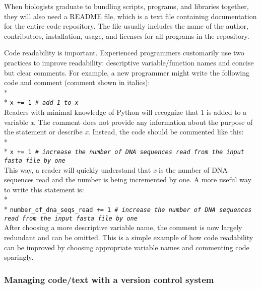 \documentclass[ChapterTOCs,krantz2]{krantz} %
\begin{document}
When biologists graduate to bundling scripts, programs, and libraries together,
they will also need a README file, which is a text file containing
documentation for the entire code repository. The file usually includes
the name of the author, contributors,
installation, usage, and licenses for all programs in the repository.  

Code readability is important.  
Experienced programmers customarily use two practices to improve readability:
descriptive variable/function names and concise but clear comments.  
For example, a new programmer might write the following code and comment 
(comment shown in italics):\\* \\*
\texttt{x += 1  \emph{\# add 1 to x}}\\

Readers with minimal knowledge of Python will recognize that 1 is added
to a variable \emph{x}. The comment does not provide any information about the purpose
of the statement or describe \emph{x}. Instead, the code should be commented like this:\\* \\*
\texttt{x += 1  \emph{\# increase the number of DNA sequences read from the
input fasta file by one}}\\

This way, a reader will quickly understand that \emph{x} is the number of DNA
sequences read and the number is being incremented by one.  A more useful way
to write this statement is:\\* \\*
\texttt{number\_of\_dna\_seqs\_read += 1
\emph{\# increase the number of DNA sequences read from the input fasta file
by one}}\\

After choosing a more descriptive variable name, the comment is now largely
redundant and can be omitted. 
This is a simple example of how code readability can be improved 
by choosing appropriate variable names and commenting code sparingly.

\subsubsection{Managing code/text with a version control system}
\end{document}
